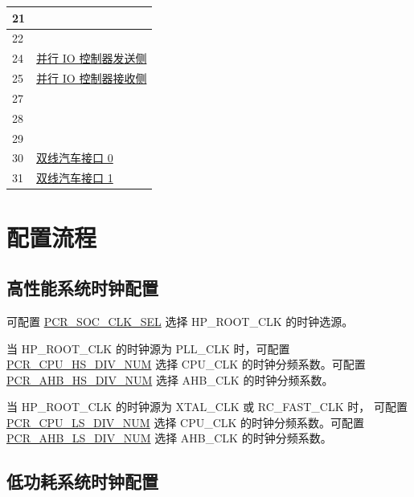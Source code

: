 \documentclass[main\_\_CN.tex]{subfiles}
\begin{document}
\begin{table}[H]
\begin{tabular}{|l|l|}
21                                  &    \nameref{mod:rmt}            \\ \hline
22                                  &    \nameref{mod:mcpwm}            \\ \hline
24                                  &    \hyperref[mod:parlio]{并行 IO 控制器发送侧}            \\ \hline
25                                  &    \hyperref[mod:parlio]{并行 IO 控制器接收侧}             \\ \hline
27                                  &     \nameref{mod:ledpwm}           \\ \hline
28                                  &     \nameref{mod:iomuxgpio}           \\ \hline
29                                  &     \nameref{mod:i2c}           \\ \hline
30                                  &       \hyperref[mod:twai]{双线汽车接口 0}         \\ \hline
31                                  &       \hyperref[mod:twai]{双线汽车接口 1}         \\ \hline
\end{tabular}
\end{table}



\section{配置流程}
\label{sec:alias-prog-procedures}

\subsection{高性能系统时钟配置}


可配置 \hyperref[fielddesc:PCRSOCCLKSEL]{PCR\_SOC\_CLK\_SEL} 选择 HP\_ROOT\_CLK 的时钟选源。


当 HP\_ROOT\_CLK 的时钟源为 PLL\_CLK 时，可配置 \hyperref[fielddesc:PCRCPUHSDIVNUM]{PCR\_CPU\_HS\_DIV\_NUM} 选择 CPU\_CLK 的时钟分频系数。可配置 \hyperref[fielddesc:PCRAHBHSDIVNUM]{PCR\_AHB\_HS\_DIV\_NUM} 选择 AHB\_CLK 的时钟分频系数。


当 HP\_ROOT\_CLK 的时钟源为 XTAL\_CLK 或 RC\_FAST\_CLK 时， 可配置 \hyperref[fielddesc:PCRCPULSDIVNUM]{PCR\_CPU\_LS\_DIV\_NUM} 选择 CPU\_CLK 的时钟分频系数。可配置 \hyperref[fielddesc:PCRAHBLSDIVNUM]{PCR\_AHB\_LS\_DIV\_NUM} 选择 AHB\_CLK 的时钟分频系数。

\subsection{低功耗系统时钟配置}
\end{document}
